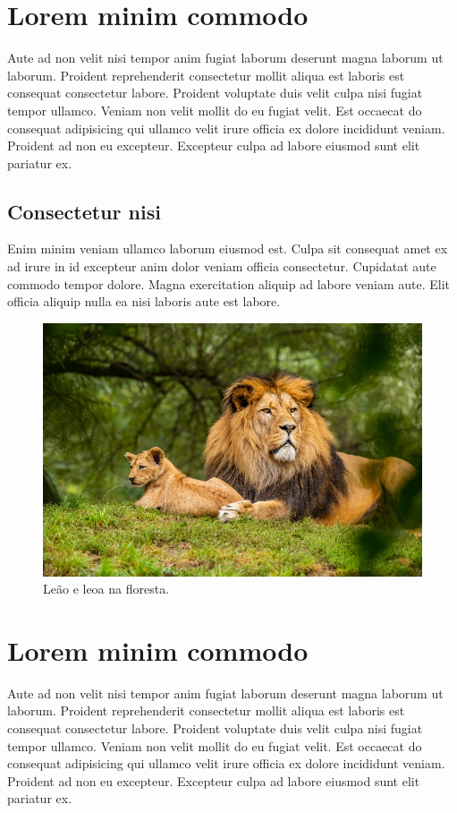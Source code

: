 \documentclass[12pt]{report}
\begin{document}
\section{Lorem minim commodo}

Aute ad non velit nisi tempor anim fugiat laborum deserunt magna laborum ut laborum. Proident reprehenderit consectetur mollit aliqua est laboris est consequat consectetur labore. Proident voluptate duis velit culpa nisi fugiat tempor ullamco. Veniam non velit mollit do eu fugiat velit. Est occaecat do consequat adipisicing qui ullamco velit irure officia ex dolore incididunt veniam. Proident ad non eu excepteur. Excepteur culpa ad labore eiusmod sunt elit pariatur ex.

\subsection{Consectetur nisi}

Enim minim veniam ullamco laborum eiusmod est. Culpa sit consequat amet ex ad irure in id excepteur anim dolor veniam officia consectetur. Cupidatat aute commodo tempor dolore. Magna exercitation aliquip ad labore veniam aute. Elit officia aliquip nulla ea nisi laboris aute est labore.

\begin{figure}[h]
    \centering
    \includegraphics[width=0.7\linewidth]{img/lion}
    \caption[Leão e leoa]{Leão e leoa na floresta.}
    \label{fig:lion}
\end{figure}

\section{Lorem minim commodo}

Aute ad non velit nisi tempor anim fugiat laborum deserunt magna laborum ut laborum. Proident reprehenderit consectetur mollit aliqua est laboris est consequat consectetur labore. Proident voluptate duis velit culpa nisi fugiat tempor ullamco. Veniam non velit mollit do eu fugiat velit. Est occaecat do consequat adipisicing qui ullamco velit irure officia ex dolore incididunt veniam. Proident ad non eu excepteur. Excepteur culpa ad labore eiusmod sunt elit pariatur ex.
\end{document}
